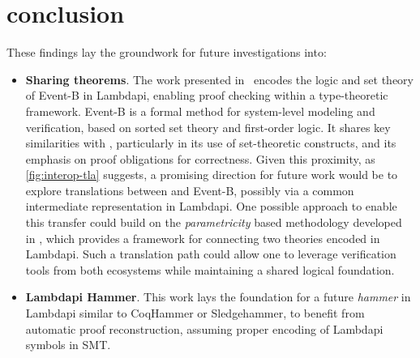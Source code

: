 \chapter{conclusion}

These findings lay the groundwork for future investigations into:

\begin{itemize}
    \item[] \textbf{Sharing \tlaplus theorems}. The work presented in~\cite{eventb2lp} encodes the logic and set theory of Event-B in Lambdapi, enabling proof checking within a type-theoretic framework.
Event-B is a formal method for system-level modeling and verification, based on sorted set theory and first-order logic.
It shares key similarities with \tlaplus, particularly in its use of set-theoretic constructs, and its emphasis on proof obligations for correctness.
Given this proximity, as \cref{fig:interop-tla} suggests, a promising direction for future work would be to explore translations between \tlaplus and Event-B, possibly via a common intermediate representation in Lambdapi.
One possible approach to enable this transfer could build on the \emph{parametricity} \cite{theorem-for-free,parametricity} based methodology developed in \cite{parametricity-lp}, which provides a framework for connecting two theories encoded in Lambdapi. 
Such a translation path could allow one to leverage verification tools from both ecosystems while maintaining a shared logical foundation.
    \item[] \textbf{Lambdapi Hammer}. This work lays the foundation for a future \emph{hammer} in Lambdapi similar to CoqHammer or Sledgehammer, to benefit from automatic proof reconstruction, assuming proper encoding of Lambdapi symbols in SMT.
\end{itemize}
